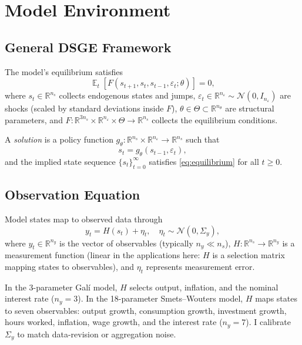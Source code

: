 \documentclass[12pt]{article}
\theoremstyle{plain}
\theoremstyle{definition}
\theoremstyle{remark}
\DeclareMathOperator{\E}{\mathbb{E}}
\newcommand{\R}{\mathbb{R}}
\newcommand{\eps}{\varepsilon}
\newcommand{\Sigmay}{\Sigma_y}
\begin{document}

\section{Model Environment}
\label{sec:model}

\subsection{General DSGE Framework}

The model's equilibrium satisfies
\begin{equation}
\label{eq:equilibrium}
\E_t\left[F(s_{t+1}, s_t, s_{t-1}, \eps_t; \theta)\right] = 0,
\end{equation}
where $s_t \in \R^{n_s}$ collects endogenous states and jumps, $\eps_t \in \R^{n_\eps} \sim \mathcal{N}(0, I_{n_\eps})$ are shocks (scaled by standard deviations inside $F$), $\theta \in \Theta \subset \R^{n_\theta}$ are structural parameters, and $F: \R^{3n_s} \times \R^{n_\eps} \times \Theta \to \R^{n_s}$ collects the equilibrium conditions.

A \textit{solution} is a policy function $g_\theta: \R^{n_s} \times \R^{n_\eps} \to \R^{n_s}$ such that
\begin{equation*}
s_t = g_\theta(s_{t-1}, \eps_t),
\end{equation*}
and the implied state sequence $\{s_t\}_{t=0}^\infty$ satisfies \eqref{eq:equilibrium} for all $t \geq 0$.

\subsection{Observation Equation}

Model states map to observed data through
\begin{equation}
\label{eq:observation}
y_t = H(s_t) + \eta_t, \quad \eta_t \sim \mathcal{N}(0, \Sigmay),
\end{equation}
where $y_t \in \R^{n_y}$ is the vector of observables (typically $n_y \ll n_s$), $H: \R^{n_s} \to \R^{n_y}$ is a measurement function (linear in the applications here: $H$ is a selection matrix mapping states to observables), and $\eta_t$ represents measurement error.

In the 3-parameter Gal\'i model, $H$ selects output, inflation, and the nominal interest rate ($n_y = 3$). In the 18-parameter Smets--Wouters model, $H$ maps states to seven observables: output growth, consumption growth, investment growth, hours worked, inflation, wage growth, and the interest rate ($n_y = 7$). I calibrate $\Sigmay$ to match data-revision or aggregation noise.
\end{document}
